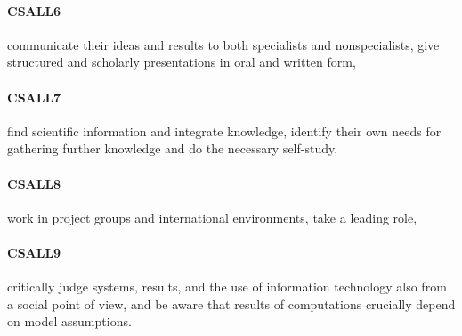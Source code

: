 \paragraph{CSALL6} communicate their ideas and results to both specialists and
  nonspecialists, give structured and scholarly presentations in oral
  and written form,
\paragraph{CSALL7} find scientific information and integrate knowledge, identify
  their own needs for gathering further knowledge and do the necessary
  self-study,
\paragraph{CSALL8} work in project groups and international environments, take a
  leading role,
\paragraph{CSALL9} critically judge systems, results, and the use of information
  technology also from a social point of view, and be aware that
  results of computations crucially depend on model assumptions.

